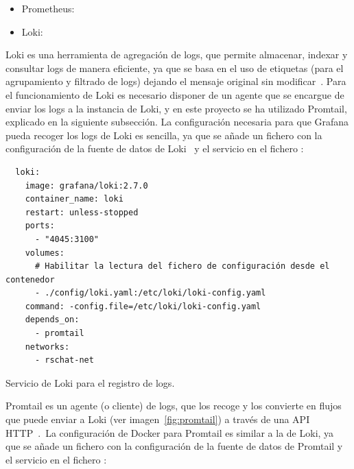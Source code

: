 \begin{itemize}
	\item Prometheus: 
	\item Loki: 
\end{itemize}
\label{itm:grafana-data-sources}

Loki es una herramienta de agregación de logs, que permite almacenar, indexar y consultar logs de manera eficiente, ya
que se basa en el uso de etiquetas (para el agrupamiento y filtrado de logs) dejando el mensaje original sin
modificar~\cite{loki-docs}.
Para el funcionamiento de Loki es necesario disponer de un agente que se encargue de enviar los logs a la instancia de
Loki, y en este proyecto se ha utilizado Promtail, explicado en la siguiente subsección.
La configuración necesaria para que Grafana pueda recoger los logs de Loki es sencilla, ya que se añade un fichero
 con la configuración de la fuente de datos de Loki~\cite{loki-config-file} y el servicio en el
fichero :

\begin{codeBlock}
	\begin{verbatim}
  loki:
    image: grafana/loki:2.7.0
    container_name: loki
    restart: unless-stopped
    ports:
      - "4045:3100"
    volumes:
      # Habilitar la lectura del fichero de configuración desde el contenedor
      - ./config/loki.yaml:/etc/loki/loki-config.yaml
    command: -config.file=/etc/loki/loki-config.yaml
    depends_on:
      - promtail
    networks:
      - rschat-net
	\end{verbatim}
	\caption{Servicio de Loki para el registro de logs.}
	\label{cod:loki-docker-compose}
\end{codeBlock}

Promtail es un agente (o cliente) de logs, que los recoge y los convierte en flujos que puede enviar a Loki (ver
imagen~\ref{fig:promtail}) a través de una API HTTP~\cite{loki-docs}.\ La configuración de Docker para Promtail es
similar a la de
Loki, ya que se añade un fichero  con la configuración de la fuente de datos de Promtail y el servicio
en el fichero :

